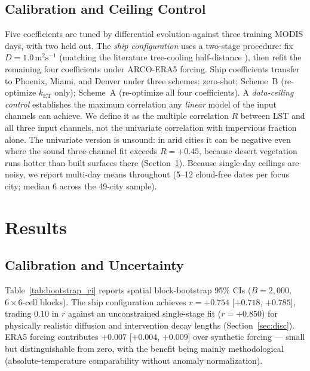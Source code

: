 \documentclass[conference]{IEEEtran}
\begin{document}
\subsection{Calibration and Ceiling Control}
Five coefficients are tuned by differential evolution
\cite{storn1997differential} against three training MODIS days, with two
held out. The \emph{ship configuration} uses a two-stage procedure: fix
$D = 1.0\,\text{m}^2\text{s}^{-1}$ (matching the literature tree-cooling
half-distance \cite{ziter2019scale}), then refit the remaining four
coefficients under ARCO-ERA5 forcing. Ship coefficients transfer to
Phoenix, Miami, and Denver under three schemes: zero-shot; Scheme~B
(re-optimize $k_{\mathrm{ET}}$ only); Scheme~A (re-optimize all four
coefficients). A \emph{data-ceiling control} establishes the maximum
correlation any \emph{linear} model of the input channels can achieve. We
define it as the multiple correlation $R$ between LST and all three input
channels, not the univariate correlation with impervious fraction alone.
The univariate version is unsound: in arid cities it can be negative even
where the sound three-channel fit exceeds $R{=}{+}0.45$, because desert
vegetation runs hotter than built surfaces there
(Section~\ref{sec:results}). Because single-day ceilings are noisy, we
report multi-day means throughout (5--12 cloud-free dates per focus
city; median 6 across the 49-city sample).

\section{Results}
\label{sec:results}

\subsection{Calibration and Uncertainty}
Table~\ref{tab:bootstrap_ci} reports spatial block-bootstrap 95\% CIs
($B{=}2{,}000$, $6{\times}6$-cell blocks). The ship configuration achieves
$r{=}{+}0.754$ [$+0.718$, $+0.785$], trading $0.10$ in $r$ against an
unconstrained single-stage fit ($r{=}{+}0.850$) for physically realistic
diffusion and intervention decay lengths (Section~\ref{sec:disc}). ERA5
forcing contributes $+0.007$ [$+0.004$, $+0.009$] over synthetic forcing —
small but distinguishable from zero, with the benefit being mainly
methodological (absolute-temperature comparability without anomaly
normalization).
\end{document}
